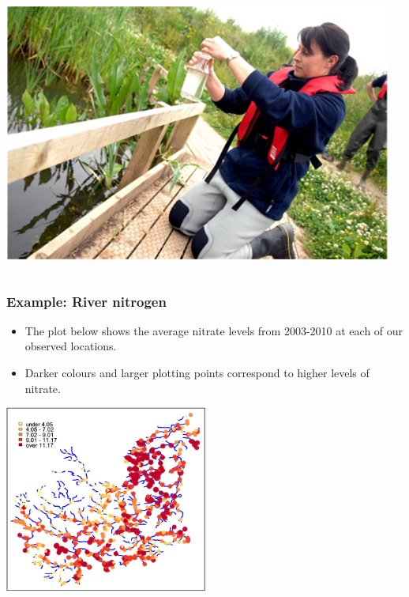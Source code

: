 \documentclass[parskip,12pt]{beamer}
\begin{document}
\begin{frame}
\begin{columns}
\begin{column}{0.32\textwidth}
\begin{center}
     \includegraphics[width=\textwidth]{WaterSampling}
          \end{center}
\end{column}
\end{columns}
\end{frame}


\begin{frame}
\frametitle{Example: River nitrogen}
 \begin{itemize}
\vspace{3mm}
\item The plot below shows the average nitrate levels from 2003-2010 at each of our observed locations.
\vspace{3mm}
\item Darker colours and larger plotting points correspond to higher levels of nitrate.
\end{itemize}
    \begin{center}
     \includegraphics[width=0.5\textwidth]{TrentData}
          \end{center}
\end{frame}
\end{document}
